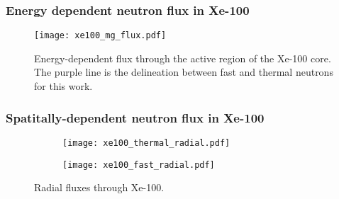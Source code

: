 \begin{frame}
    \frametitle{Energy dependent neutron flux in Xe-100}
    \begin{figure}
        \centering 
        \texttt{[image: xe100\_mg\_flux.pdf]}
        \caption{Energy-dependent flux through the active region 
        of the Xe-100 core. The purple line is the delineation 
        between fast and thermal neutrons for this work.}
    \end{figure}
\end{frame}

\begin{frame}
    \frametitle{Spatitally-dependent neutron flux in Xe-100}
    \begin{figure}
        \centering 
        \begin{subfigure}{0.49\textwidth}
            \texttt{[image: xe100\_thermal\_radial.pdf]}
        \end{subfigure}
        \begin{subfigure}{0.49\textwidth}
            \texttt{[image: xe100\_fast\_radial.pdf]}
        \end{subfigure}
        \caption{Radial fluxes through Xe-100.}
        \label{fig:xe100-flux}
    \end{figure}
\end{frame}
